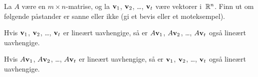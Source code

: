 





\begin{oppgave}
La $A$ være en $m \times n$-matrise, og la $\mathbf{v}_1$, $\mathbf{v}_2$,
\ldots, $\mathbf{v}_t$ være vektorer i~$\mathbb{R}^n$.  Finn ut om følgende
påstander er sanne eller ikke (gi et bevis eller et moteksempel).
\begin{punkt}
Hvis $\mathbf{v}_1$, $\mathbf{v}_2$, \ldots, $\mathbf{v}_t$ er lineært uavhengige, så
er $A \mathbf{v}_1$, $A \mathbf{v}_2$, \ldots, $A \mathbf{v}_t$ også lineært
uavhengige.
\end{punkt}
\begin{punkt}
Hvis $A \mathbf{v}_1$, $A \mathbf{v}_2$, \ldots, $A \mathbf{v}_t$ er lineært
uavhengige, så er $\mathbf{v}_1$, $\mathbf{v}_2$, \ldots, $\mathbf{v}_t$ også lineært
uavhengige.
\end{punkt}
\end{oppgave}

